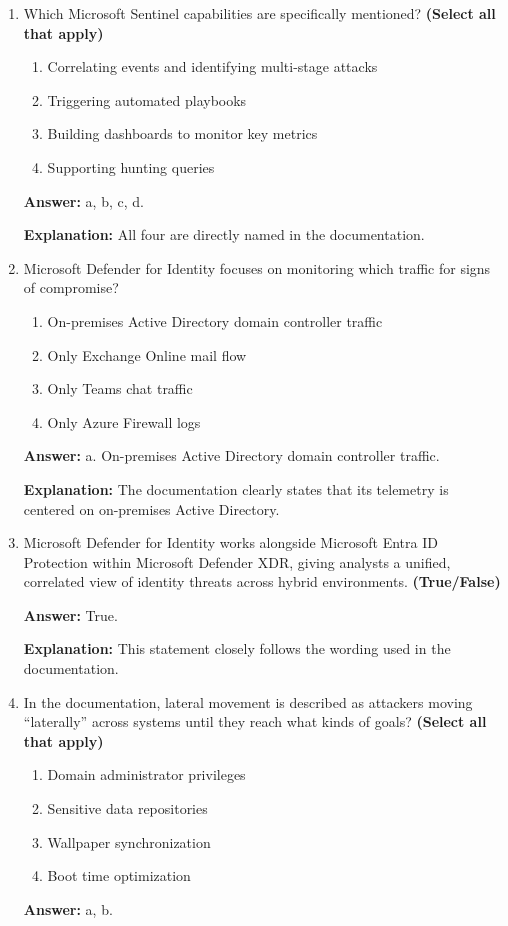 \documentclass[10pt]{article}
\begin{document}
\begin{enumerate}[leftmargin=*]
\textbf{Explanation:} The documentation explicitly describes Microsoft Sentinel as a cloud-native SIEM solution.

\item Which Microsoft Sentinel capabilities are specifically mentioned? \textbf{(Select all that apply)}
\begin{enumerate}[label=\alph*., leftmargin=1.5em]
\item Correlating events and identifying multi-stage attacks
\item Triggering automated playbooks
\item Building dashboards to monitor key metrics
\item Supporting hunting queries
\end{enumerate}
\textbf{Answer:} a, b, c, d.

\textbf{Explanation:} All four are directly named in the documentation.

\item Microsoft Defender for Identity focuses on monitoring which traffic for signs of compromise?
\begin{enumerate}[label=\alph*., leftmargin=1.5em]
\item On-premises Active Directory domain controller traffic
\item Only Exchange Online mail flow
\item Only Teams chat traffic
\item Only Azure Firewall logs
\end{enumerate}
\textbf{Answer:} a. On-premises Active Directory domain controller traffic.

\textbf{Explanation:} The documentation clearly states that its telemetry is centered on on-premises Active Directory.

\item Microsoft Defender for Identity works alongside Microsoft Entra ID Protection within Microsoft Defender XDR, giving analysts a unified, correlated view of identity threats across hybrid environments. \textbf{(True/False)}

\textbf{Answer:} True.

\textbf{Explanation:} This statement closely follows the wording used in the documentation.

\item In the documentation, lateral movement is described as attackers moving ``laterally'' across systems until they reach what kinds of goals? \textbf{(Select all that apply)}
\begin{enumerate}[label=\alph*., leftmargin=1.5em]
\item Domain administrator privileges
\item Sensitive data repositories
\item Wallpaper synchronization
\item Boot time optimization
\end{enumerate}
\textbf{Answer:} a, b.


\end{enumerate}
\end{document}
